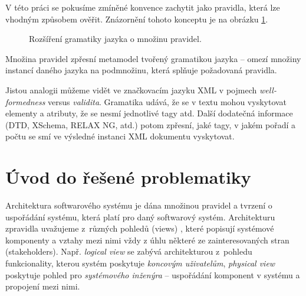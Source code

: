 V této práci se pokusíme zmíněné konvence zachytit jako pravidla, která lze vhodným způsobem ověřit. Znázornění tohoto konceptu je na obrázku \ref{work_scope}.
\begin{figure}[h!]
  \centering
  \caption{Rozšíření gramatiky jazyka o množinu pravidel.\label{work_scope}}
\end{figure}
Množina pravidel zpřesní metamodel tvořený gramatikou jazyka -- omezí množiny instancí daného jazyka na podmnožinu, která splňuje požadovaná pravidla.

Jistou analogii můžeme vidět ve značkovacím jazyku XML v pojmech \emph{well-formedness} versus \emph{validita}. Gramatika udává, že se v textu mohou vyskytovat elementy a atributy, že se nesmí  jednotlivé tagy atd. Další dodatečná informace (DTD, XSchema, RELAX NG, atd.) potom zpřesní, jaké tagy, v jakém pořadí a počtu se smí ve výsledné instanci XML dokumentu vyskytovat.

\section{Úvod do řešené problematiky}

Architektura softwarového systému \cite{wiki:software_architecture} je dána množinou pravidel a tvrzení o uspořádání systému, která platí pro daný softwarový systém. Architekturu zpravidla uvažujeme z~různých pohledů (views) \cite{wiki:four_plus_one_views}, které popisují systémové komponenty a vztahy mezi nimi vždy z úhlu některé ze zainteresovaných stran (stakeholders). Např. \emph{logical view} se zabývá architekturou z~pohledu funkcionality, kterou systém poskytuje \emph{koncovým uživatelům}, \emph{physical view} poskytuje pohled pro \emph{systémového inženýra} -- uspořádání komponent v systému a propojení mezi nimi. 


